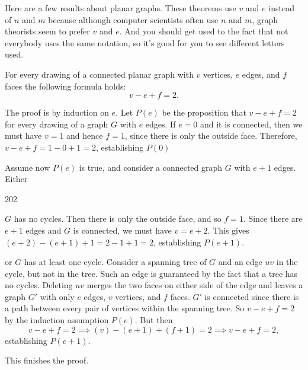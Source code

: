 Here are a few results about planar graphs.
These theorems use $v$ and $e$ instead of $n$ and $m$ because although computer scientists
often use $n$ and $m$, graph theorists seem to prefer $v$ and $e$. And you should get used to
the fact that not everybody uses the same notation, so it's good for you to see different letters used.

\begin{thm} 
For every drawing of a connected
planar graph with $v$ vertices, $e$ edges, and $f$ faces the
following formula holds: $$v-e+f = 2.  $$
\begin{pf}
The proof is by induction on $e$. Let $P(e)$ be the proposition
that $v - e + f = 2$ for every drawing of a graph $G$ with $e$
edges. If  $e = 0$ and it is connected, then we must have  $v = 1$
 and hence $f = 1$, since there is only the outside face. Therefore,
 $v - e + f = 1 - 0 + 1 = 2$, establishing $P(0)$
 
Assume now $P(e)$ is true, and consider a connected graph $G$
with $e + 1$ edges. Either
\begin{dingautolist}{202}
\item  $G$ has no cycles. Then there is only the outside face, and
 so $f=1$. Since there are $e+1$ edges and $G$ is connected, we must have $v=e+2$. This gives
 $(e+2)-(e+1)+1 = 2-1+1 = 2$, establishing $P(e+1)$.
\item or $G$ has at least one cycle. Consider a spanning
tree of $G$ and an edge $uv$ in the cycle, but not in the tree.
Such an edge is guaranteed by the fact that a tree has no cycles.
Deleting $uv$ merges the two faces on either side of the edge and
leaves a graph $G'$ with only $e$ edges, $v$ vertices, and $f$
faces. $G'$ is connected since there is a path between every pair
of vertices within the spanning tree. So $v - e + f = 2$ by the
induction assumption $P(e)$. But then
$$v - e + f
= 2 \implies (v) - (e+1) + (f+1) = 2 \implies v-e+f = 2,
$$establishing $P(e+1)$.
\end{dingautolist}
This finishes the proof.
\end{pf}\end{thm}

